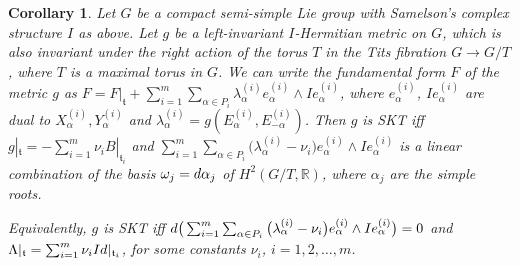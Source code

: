 \documentclass[10pt,a4paper]{article}
\numberwithin{equation}{section}
\newtheorem{Corollary}[Theorem]{Corollary}
\theoremstyle{definition}
\begin{document}
\begin{Corollary} \label{th4.1bis}
Let $G$ be a compact semi-simple Lie group with Samelson's complex structure $I$ as above. Let $g$ be a left-invariant $I$-Hermitian metric on $G$, which is also invariant under the right action of the torus $T$ in the Tits fibration $G\rightarrow G/T$, where $T$ is a maximal torus in $G$. We can write the fundamental form $F$ of the metric $g$
as $F = F|_{\mathfrak t} + \sum_{i=1}^m \sum_{\alpha \in P_i} \lambda_{\alpha} ^{(i)} e_{\alpha}^{(i)} \wedge I e_{\alpha}^{(i)}$, where $e_{\alpha}^{(i)}$, $Ie_{\alpha}^{(i)}$ are dual to $X_{\alpha}^{(i)}, Y_{\alpha}^{(i)}$ and $\lambda_{\alpha} ^{(i)}= g (E_{\alpha}^{(i)}, E_{-\alpha}^{(i)})$. Then
 $g$ is SKT iff $g |_{\mathfrak t} = - \sum_{i =1}^m \nu_i B|_{\mathfrak t_i}$ and $ \sum_{i =1}^m \sum_{\alpha \in P_i} \big(\lambda_{\alpha}^{(i)} - \nu_i\big) e_{\alpha}^{(i)} \wedge I e_{\alpha}^{(i)}$ is a linear combination of the basis $\omega_j = {\rm d} \alpha_j$ of $H^2(G/T, \mathbb R)$, where $\alpha_j$ are the simple roots.

Equivalently, $g$ is SKT iff ${\rm d}\big( \sum_{i =1}^m \sum_{\alpha \in P_i} \big(\lambda_{\alpha}^{(i)} - \nu_i\big) e_{\alpha}^{(i)}\wedge I e_{\alpha}^{(i)}\big)=0$ and $\Lambda |_{\mathfrak t} = \sum_{i=1}^m \nu_i {\rm Id}|_{\mathfrak t_i}$, for some constants $\nu_i$, $i= 1,2, \dots, m$.
\end{Corollary}
\end{document}
